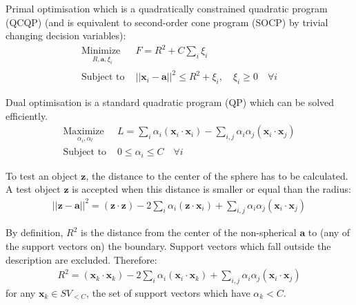 \documentclass[3p,times]{elsarticle}
\begin{document}
Primal optimisation which is a quadratically constrained quadratic program (QCQP) (and is equivalent to second-order cone program (SOCP) by trivial changing decision variables):
\begin{subequations}\label{eq:svdd_primal}
\begin{align}
\underset{
	\begin{array}{c}
		 R, \mathbf{a}, \xi_i
	\end{array}}{\text{Minimize }} & F = R^2 + C \sum_i \xi_i \\
\text{Subject to } & \left|\left| \mathbf{x}_i - \mathbf{a} \right|\right|^2 \le R^2 + \xi_i, \quad \xi_i \ge 0 \quad \forall i
\end{align}
\end{subequations}

Dual optimisation is a standard quadratic program (QP) which can be solved efficiently.
\begin{subequations}\label{eq:svdd_dual}
\begin{align}
\underset{
	\begin{array}{c}
		 \alpha_i, \alpha_l
	\end{array}}{\text{Maximize }} & L = \sum_i \alpha_i \left( \mathbf{x}_i \cdot \mathbf{x}_i \right) - \sum_{i,j} \alpha_i \alpha_j \left( \mathbf{x}_i \cdot \mathbf{x}_j \right)\\
\text{Subject to } & 0 \le \alpha_i \le C \quad \forall i
\end{align}
\end{subequations}

To test an object $\mathbf{z}$, the distance to the center of the sphere has to be calculated. A test
object $\mathbf{z}$ is accepted when this distance is smaller or equal than the radius:
\begin{align}
\left|\left| \mathbf{z} - \mathbf{a} \right|\right|^2 = \left( \mathbf{z} \cdot \mathbf{z} \right) - 2 \sum_i \alpha_i \left( \mathbf{z} \cdot \mathbf{x}_i \right) + \sum_{i,j} \alpha_i \alpha_j \left( \mathbf{x}_i \cdot \mathbf{x}_j \right)
\end{align}

By definition, $R^2$ is the distance from the center of the non-spherical $\mathbf{a}$ to (any of the support vectors on) the boundary. Support vectors which fall outside the description are excluded. Therefore:
\begin{align}
R^2 = \left( \mathbf{x}_k \cdot \mathbf{x}_k \right) - 2 \sum_i \alpha_i \left( \mathbf{x}_i \cdot \mathbf{x}_k \right) + \sum_{i,j} \alpha_i \alpha_j \left( \mathbf{x}_i \cdot \mathbf{x}_j \right)
\end{align}
for any $\mathbf{x}_k \in SV_{<C}$, the set of support vectors which have $\alpha_k < C$.
\end{document}
